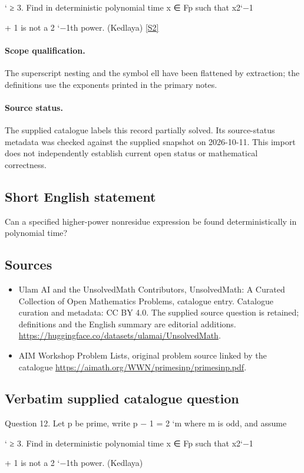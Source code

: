 \documentclass[11pt]{article}
\begin{document}
` ≥ 3. Find in deterministic polynomial time x ∈ Fp such that x2`−1

+ 1 is not a 2 `−1th power. (Kedlaya) \href{https://aimath.org/WWN/primesinp/primesinp.pdf}{[S2]}
\paragraph{Scope qualification.}
The superscript nesting and the symbol ell have been flattened by extraction; the definitions use the exponents printed in the primary notes.
\paragraph{Source status.}
The supplied catalogue labels this record partially solved. Its source-status metadata was checked against the supplied snapshot on 2026-10-11. This import does not independently establish current open status or mathematical correctness.
\subsection{Short English statement}
Can a specified higher-power nonresidue expression be found deterministically in polynomial time?
\subsection{Sources}
\begin{itemize}
\item[S1] Ulam AI and the UnsolvedMath Contributors, UnsolvedMath: A Curated Collection of Open Mathematics Problems, catalogue entry. Catalogue curation and metadata: CC BY 4.0. The supplied source question is retained; definitions and the English summary are editorial additions.
\url{https://huggingface.co/datasets/ulamai/UnsolvedMath}.
\item[S2] AIM Workshop Problem Lists, original problem source linked by the catalogue
\url{https://aimath.org/WWN/primesinp/primesinp.pdf}.
\end{itemize}
\subsection{Verbatim supplied catalogue question}
Question 12. Let p be prime, write p − 1 = 2 `m where m is odd, and assume

` ≥ 3. Find in deterministic polynomial time x ∈ Fp such that x2`−1

+ 1 is not a 2 `−1th power. (Kedlaya)
\end{document}
